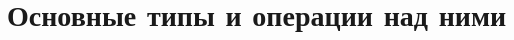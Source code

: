 \documentclass[10pt]{book}
\begin{document}
\chapter{Основные типы и операции над ними}






\end{document}
